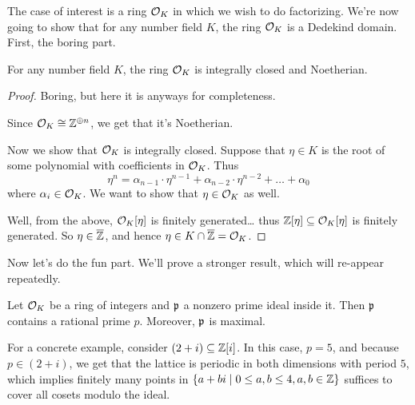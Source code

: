 The case of interest is a ring $\mathcal O_K$ in which we wish to do factorizing.
We're now going to show that for any number field $K$, the ring $\mathcal O_K$ is a Dedekind domain.
First, the boring part.
\begin{proposition}
	For any number field $K$, the ring $\mathcal O_K$ is integrally closed and Noetherian.
\end{proposition}
\begin{proof}
	Boring, but here it is anyways for completeness.

	Since $\mathcal O_K \cong \mathbb Z^{\oplus n}$, we get that it's Noetherian.

	Now we show that $\mathcal O_K$ is integrally closed.
	Suppose that $\eta \in K$ is the root of some polynomial with coefficients in $\mathcal O_K$.
	Thus
	\[ \eta^n = \alpha_{n-1} \cdot \eta^{n-1} + \alpha_{n-2} \cdot \eta^{n-2}
		+ \dots + \alpha_0 \]
	where $\alpha_i \in \mathcal O_K$. We want to show that $\eta \in \mathcal O_K$ as well.

	Well, from the above, $\mathcal O_K[\eta]$ is finitely generated\dots
	thus $\mathbb Z[\eta] \subseteq \mathcal O_K[\eta]$ is finitely generated.
	So $\eta \in \overline{\mathbb Z}$, and hence $\eta \in K \cap \overline{\mathbb Z} = \mathcal O_K$.
\end{proof}
Now let's do the fun part.
We'll prove a stronger result, which will re-appear repeatedly.
\begin{theorem}
	Let $\mathcal O_K$ be a ring of integers
	and $\mathfrak p$ a nonzero prime ideal inside it.
	Then $\mathfrak p$ contains a rational prime $p$.
	Moreover, $\mathfrak p$ is maximal.
\end{theorem}
For a concrete example, consider $(2+i) \subseteq \mathbb Z[i]$. In this case, $p = 5$,
and because $p \in (2+i)$, we get that the lattice is periodic in both dimensions
with period $5$, which implies finitely many points in $\{a+bi \mid 0 \le a, b \le 4, a, b \in \mathbb Z\}$
suffices to cover all cosets modulo the ideal.

